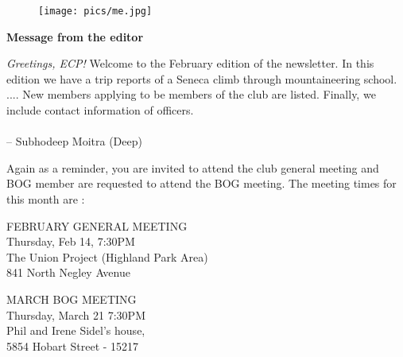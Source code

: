 \documentclass[10pt,a4paper]{article}
\newcommand{\NewsItem}[1]{%
		\usefont{T1}{augie}{m}{n} 	
		\large \bf #1 \vspace{4pt}
		\par \normalsize \normalfont}
\begin{document}
\begin{center}
\begin{minipage}[h]{0.8\linewidth}
	\begin{wrapfigure}{l}{0.41\textwidth}
		\texttt{[image: pics/me.jpg]}
		\\%
	\end{wrapfigure}
	
	\NewsItem{Message from the editor}
	\emph{Greetings, ECP!} Welcome to the February edition of the newsletter. In this edition we have a trip reports of a Seneca climb through mountaineering school. ....
New members applying to be members of the club are listed. Finally, we include contact information of officers.
\\
\\
-- Subhodeep Moitra (Deep)

\vspace{0.5cm}

	Again as a reminder, you are invited to attend the club general meeting and BOG member are requested to attend the BOG meeting. The meeting times for this month are :
	
\vspace{1cm}

\begin{multicols}{2}
\Large
FEBRUARY GENERAL MEETING\\
Thursday, Feb 14, 7:30PM\\
The Union Project (Highland Park Area)\\
841 North Negley Avenue

MARCH BOG MEETING\\
Thursday, March 21 7:30PM\\
Phil and Irene  Sidel's house,\\
5854 Hobart Street - 15217



\normalsize
\end{multicols}
	
\end{minipage}
\end{center}



\pagebreak
\clearpage
\end{document}
